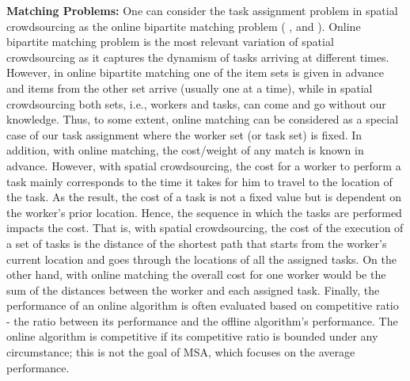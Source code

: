 \documentclass{USC-Thesis}
\numberwithin{equation}{chapter}
\begin{document}
\textbf{Matching Problems:} One can consider the task assignment problem in spatial crowdsourcing as the online bipartite matching problem (\cite{karp1990optimal} \cite{kalyanasundaram93} \cite{Khuller94}, \cite{kalyanasundaram2000optimal} and \cite{mehta2007adwords}). Online bipartite matching problem is the most relevant variation of spatial crowdsourcing as it captures the dynamism of tasks arriving at different times. However, in online bipartite matching one of the item sets is given in advance and items from the other set arrive (usually one at a time), while in spatial crowdsourcing both sets, i.e., workers and tasks, can come and go without our knowledge. Thus, to some extent, online matching can be considered as a special case of our task assignment where the worker set (or task set) is fixed. In addition, with online matching, the cost/weight of any match is known in advance. However, with spatial crowdsourcing, the cost for a worker to perform a task mainly corresponds to the time it takes for him to travel to the location of the task. As the result, the cost of a task is not a fixed value but is dependent on the worker's prior location. Hence, the sequence in which the tasks are performed impacts the cost. That is, with spatial crowdsourcing, the cost of the execution of a set of tasks is the distance of the shortest path that starts from the worker's current location and goes through the locations of all the assigned tasks. On the other hand, with online matching \cite{kalyanasundaram2000optimal} the overall cost for one worker would be the sum of the distances between the worker and each assigned task. Finally, the performance of an online algorithm is often evaluated based on competitive ratio - the ratio between its performance and the offline algorithm's performance. The online algorithm is competitive if its competitive ratio is bounded under any circumstance; this is not the goal of MSA, which focuses on the average performance.
\end{document}
